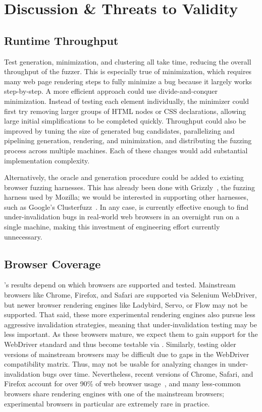 \section{Discussion \& Threats to Validity}

\subsection{Runtime Throughput}

Test generation, minimization, and clustering all take time,
  reducing the overall throughput of the fuzzer.
This is especially true of minimization,
  which requires many web page rendering steps to fully minimize a bug
  because it largely works step-by-step.
A more efficient approach
  could use divide-and-conquer minimization.
Instead of testing each element individually,
  the minimizer could first try removing larger groups
  of HTML nodes or CSS declarations,
  allowing large initial simplifications to be completed quickly.
Throughput could also be improved by
  tuning the size of generated bug candidates,
  parallelizing and pipelining
  generation, rendering, and minimization,
  and distributing the fuzzing process across multiple machines.
Each of these changes would add substantial implementation complexity.

Alternatively, the \toolname oracle and generation procedure
  could be added to existing browser fuzzing harnesses.
This has already been done with Grizzly~\cite{grizzly},
  the fuzzing harness used by Mozilla;
  we would be interested in supporting other harnesses,
  such as Google's Clusterfuzz~\cite{clusterfuzz}.
In any case, \toolname is currently effective enough
  to find under-invalidation bugs in real-world web browsers
  in an overnight run on a single machine,
  making this investment of engineering effort currently unnecessary.

\subsection{Browser Coverage}

\toolname's results depend on which browsers are supported and tested.
Mainstream browsers like Chrome, Firefox, and Safari
  are supported via Selenium WebDriver,
  but newer browser rendering engines like Ladybird, Servo, or Flow
  may not be supported.
That said, these more experimental rendering engines also pursue
  less aggressive invalidation strategies,
  meaning that under-invalidation testing may be less important.
As these browsers mature, we expect them to gain support
  for the WebDriver standard and thus become testable via \toolname.
Similarly, testing older versions of mainstream browsers
  may be difficult due to gaps in the WebDriver compatibility matrix.
Thus, \toolname may not be usable for analyzing changes
  in under-invalidation bugs over time.
Nevertheless, recent versions of Chrome, Safari, and Firefox
  account for over 90\% of web browser usage~\cite{statcounterBrowserShare2026},
  and many less-common browsers share rendering engines
  with one of the mainstream browsers;
  experimental browsers in particular are extremely rare in practice.


